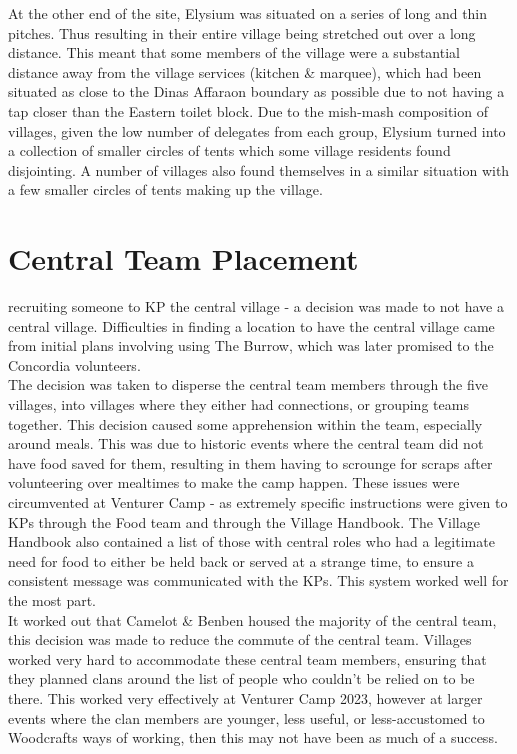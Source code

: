 At the other end of the site, Elysium was situated on a series of long and thin pitches. Thus resulting in their entire village being stretched out over a long distance. This meant that some members of the village were a substantial distance away from the village services (kitchen \& marquee), which had been situated as close to the Dinas Affaraon boundary as possible due to not having a tap closer than the Eastern toilet block. Due to the mish-mash composition of villages, given the low number of delegates from each group, Elysium turned into a collection of smaller circles of tents which some village residents found disjointing. A number of villages also found themselves in a similar situation with a few smaller circles of tents making up the village. 

\section{Central Team Placement}
recruiting someone to KP the central village - a decision was made to not have a central village. Difficulties in finding a location to have the central village came from initial plans involving using The Burrow, which was later promised to the Concordia volunteers. \\

The decision was taken to disperse the central team members through the five villages, into villages where they either had connections, or grouping teams together. This decision caused some apprehension within the team, especially around meals. This was due to historic events where the central team did not have food saved for them, resulting in them having to scrounge for scraps after volunteering over mealtimes to make the camp happen. These issues were circumvented at Venturer Camp - as extremely specific instructions were given to KPs through the Food team and through the Village Handbook. The Village Handbook also contained a list of those with central roles who had a legitimate need for food to either be held back or served at a strange time, to ensure a consistent message was communicated with the KPs. This system worked well for the most part.\\

It worked out that Camelot \& Benben housed the majority of the central team, this decision was made to reduce the commute of the central team. Villages worked very hard to accommodate these central team members, ensuring that they planned clans around the list of people who couldn't be relied on to be there. This worked very effectively at Venturer Camp 2023, however at larger events where the clan members are younger, less useful, or less-accustomed to Woodcrafts ways of working, then this may not have been as much of a success.

